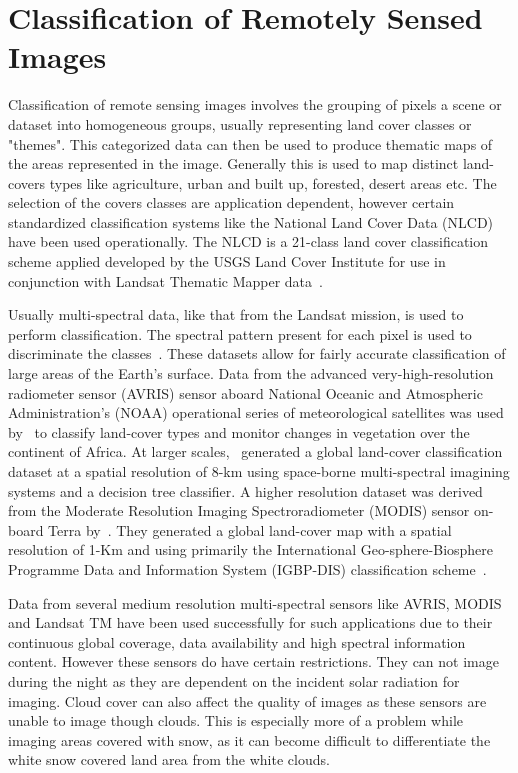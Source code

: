 \section{Classification of Remotely Sensed Images}
Classification of remote sensing images involves the grouping of pixels a scene or dataset into homogeneous groups, usually representing land cover classes or "themes". This categorized data can then be used to produce thematic maps of the areas represented in the image. Generally this is used to map distinct land-covers types like agriculture, urban and built up, forested, desert areas etc. The selection of the covers classes are application dependent, however certain standardized classification systems like the National Land Cover Data (NLCD) have been used operationally. The NLCD is a 21-class land cover classification scheme applied developed by the USGS Land Cover Institute for use in conjunction with Landsat Thematic Mapper data~\cite{jin2013comprehensive}. 

Usually multi-spectral data, like that from the Landsat mission, is used to perform classification.  The spectral pattern present for each pixel is used to discriminate the classes~\cite{lillesand1979remote}. These datasets allow for fairly accurate classification of large areas of the Earth's surface.  Data from the advanced very-high-resolution radiometer sensor (AVRIS) sensor aboard National Oceanic and Atmospheric Administration's (NOAA)  operational series of meteorological satellites was used by~\cite{Tucker25011985} to classify land-cover types and monitor changes in vegetation over the continent of Africa. At larger scales,~\cite{de1998global} generated a global land-cover classification dataset at a spatial resolution of 8-km using space-borne multi-spectral imagining systems and a decision tree classifier. A higher resolution dataset was derived from the Moderate Resolution Imaging Spectroradiometer (MODIS) sensor on-board Terra by~\cite{friedl2002global}. They generated a global land-cover map with a spatial resolution of 1-Km and using primarily the International Geo-sphere-Biosphere Programme Data and Information System (IGBP-DIS) classification scheme~\cite{Loveland97IGBP}.

Data from several medium resolution multi-spectral sensors like AVRIS, MODIS and Landsat TM have been used successfully for such applications due to their continuous global coverage, data availability and high spectral information content. However these sensors do have certain restrictions. They can not image during the night as they are dependent on the incident solar radiation for imaging. Cloud cover can also affect the quality of images as these sensors are unable to image though clouds. This is especially more of a problem while imaging areas covered with snow, as it can become difficult to differentiate the white snow covered land area from the white clouds. 

